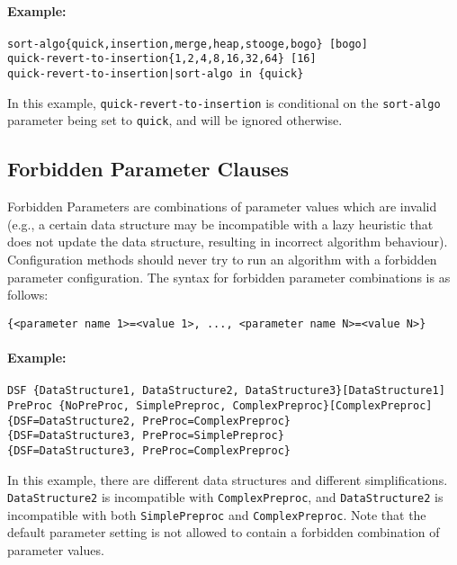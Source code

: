 \documentclass[manual.tex]{subfiles}
\begin{document}
\paragraph{Example:}

\begin{verbatim}
sort-algo{quick,insertion,merge,heap,stooge,bogo} [bogo]
quick-revert-to-insertion{1,2,4,8,16,32,64} [16]
quick-revert-to-insertion|sort-algo in {quick}
\end{verbatim}
In this example, \texttt{quick-revert-to-insertion} is conditional on the \texttt{sort-algo} parameter being set to \texttt{quick}, and will be ignored otherwise.


\subsection{Forbidden Parameter Clauses}

Forbidden Parameters are combinations of parameter values which are invalid (e.g., a certain data structure may be incompatible with a lazy heuristic that does not update the data structure, resulting in incorrect algorithm behaviour).
%
Configuration methods should never try to run an algorithm with a forbidden parameter configuration. 
%
The syntax for forbidden parameter combinations is as follows:

\begin{verbatim}
{<parameter name 1>=<value 1>, ..., <parameter name N>=<value N>}
\end{verbatim}

\paragraph{Example:}
\begin{verbatim}
DSF {DataStructure1, DataStructure2, DataStructure3}[DataStructure1]
PreProc {NoPreProc, SimplePreproc, ComplexPreproc}[ComplexPreproc]
{DSF=DataStructure2, PreProc=ComplexPreproc}
{DSF=DataStructure3, PreProc=SimplePreproc}
{DSF=DataStructure3, PreProc=ComplexPreproc}
\end{verbatim}

In this example, there are different data structures and different simplifications.
\texttt{DataStructure2} is incompatible with \texttt{ComplexPreproc}, and 
\texttt{DataStructure2} is incompatible with both \texttt{SimplePreproc} and \texttt{ComplexPreproc}.
Note that the default parameter setting is not allowed to contain a forbidden combination of parameter values.
\end{document}
